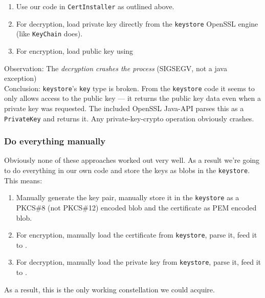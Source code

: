 \documentclass[a4paper]{scrartcl}
\begin{document}
			\begin{enumerate}
				\item Use our code in \texttt{CertInstaller} as outlined above.
				\item For decryption, load private key directly from the \texttt{keystore} OpenSSL engine (like \texttt{KeyChain} does).
				\item For encryption, load public key using 
			\end{enumerate}
			Observation:
			The \emph{decryption crashes the process} (SIGSEGV, not a java exception)\\
			Conclusion:
			\texttt{keystore}'s \texttt{key} type is broken. From the \texttt{keystore} code it seems to only allows access to the public key --- it returns the public key data even when a private key was requested. The included OpenSSL Java-API parses this as a \texttt{PrivateKey} and returns it. Any private-key-crypto operation obviously crashes.

		\subsubsection{Do everything manually}
			Obviously none of these approaches worked out very well. As a result we're going to do everything in our own code and store the keys as blobs in the \texttt{keystore}. This means:
			\begin{enumerate}
				\item Manually generate the key pair, manually store it in the \texttt{keystore} as a PKCS\#8 (not PKCS\#12) encoded blob and the certificate as PEM encoded blob.
				\item For encryption, manually load the certificate from \texttt{keystore}, parse it, feed it to .
				\item For decryption, manually load the private key from \texttt{keystore}, parse it, feed it to .
			\end{enumerate}
			As a result, this is the only working constellation we could acquire.
\end{document}
